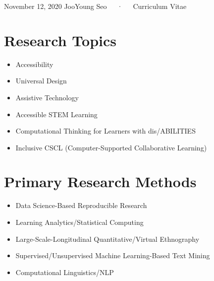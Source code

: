 \documentclass[11pt, a4paper]{awesome-cv}
\providecommand{\tightlist}{%
	\setlength{\itemsep}{0pt}\setlength{\parskip}{0pt}}
\begin{document}
\makecvheader

\makecvfooter
  {November 12, 2020}
    {JooYoung Seo~~~·~~~Curriculum Vitae}
  {\thepage}





\hypertarget{research-topics}{%
\section{Research Topics}\label{research-topics}}

\begin{itemize}
\tightlist
\item
  Accessibility
\item
  Universal Design
\item
  Assistive Technology
\item
  Accessible STEM Learning
\item
  Computational Thinking for Learners with dis/ABILITIES
\item
  Inclusive CSCL (Computer-Supported Collaborative Learning)
\end{itemize}

\hypertarget{primary-research-methods}{%
\section{Primary Research Methods}\label{primary-research-methods}}

\begin{itemize}
\tightlist
\item
  Data Science-Based Reproducible Research
\item
  Learning Analytics/Statistical Computing
\item
  Large-Scale-Longitudinal Quantitative/Virtual Ethnography
\item
  Supervised/Unsupervised Machine Learning-Based Text Mining
\item
  Computational Linguistics/NLP
\end{itemize}
\end{document}

